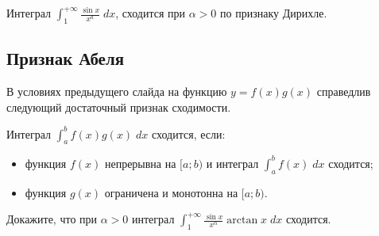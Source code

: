     \begin{example}
    	Интеграл $\displaystyle \int_1^{+\infty} {\frac{\sin{x}}{x^a}} \; dx$, сходится при $\alpha > 0$ по признаку Дирихле.
    \end{example}
    
    \subsection{Признак Абеля}
    
    В условиях предыдущего слайда на функцию $y = f(x)g(x)$ справедлив следующий достаточный признак сходимости.
    
    \begin{theorem}
    		Интеграл $\int_a^b f(x)g(x) \; dx$ сходится, если:
    	\begin{itemize}
    		\item функция $f(x)$ непрерывна на $[a; b)$ и интеграл $\int_a^b f(x) \; dx$ сходится;
    		\item функция $g(x)$ ограничена и монотонна на $[a; b)$.
    	\end{itemize}
    \end{theorem}
    
    \begin{example}
    	Докажите, что при $\alpha > 0$ интеграл $\displaystyle \int_1^{+\infty} \frac{\sin{x}}{x^{\alpha}} \arctan{x} \; dx$ сходится.
    \end{example}
	

